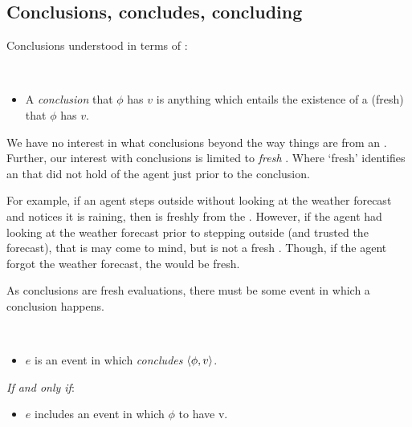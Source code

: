 \subsection{Conclusions, concludes, concluding}
\label{sec:concl-events-which}

\begin{note}
  Conclusions understood in terms of :

  \begin{definition}[Conclusions]
    \label{assu:concluding:pvp}
    \mbox{ }
    \vspace{-\baselineskip}
    \begin{itemize}
    \item
      A \emph{conclusion} that \(\phi\) has \val{} \(v\) is anything which entails the existence of a {\color{green} (fresh)} \evalN{} that \(\phi\) has \val{} \(v\).
    \end{itemize}
    \vspace{-\baselineskip}
  \end{definition}

  \noindent%
  We have no interest in what conclusions beyond \evals{} the way things are from an \agpe{}.
  Further, our interest with conclusions is limited to \emph{fresh} \evals{}.
  Where `fresh' identifies an \eval{} that did not hold of the agent just prior to the conclusion.

  For example, if an agent steps outside without looking at the weather forecast and notices it is raining, then  is freshly \evaled{}  from the \agpe{}.
  However, if the agent had looking at the weather forecast prior to stepping outside (and trusted the forecast), that  is \evaled{}  may come to mind, but is not a fresh \evalN{}.
  Though, if the agent forgot the weather forecast, the \evalN{} would be fresh.
\end{note}

\begin{note}
  As conclusions are fresh evaluations, there must be some event in which a conclusion happens.

  \begin{definition}
    \label{def:conclusionE}
    \mbox{ }
    \vspace{-\baselineskip}
    \begin{itemize}
    \item
      \(e\) is an event in which \vAgent{} \emph{concludes} \(\langle \phi, v \rangle\).
    \end{itemize}
    \emph{If and only if}:
    \begin{itemize}
    \item
      \(e\) includes an event in which \vAgent{} \evals{} \(\phi\) to have \val{} v.
    \end{itemize}
    \vspace{-\baselineskip}
  \end{definition}
\end{note}

